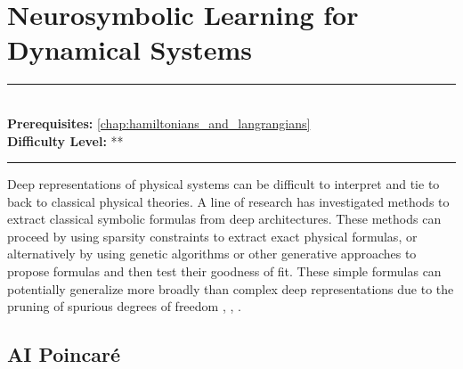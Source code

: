 \documentclass[book.tex]{subfiles}
\begin{document}
\chapter{Neurosymbolic Learning for Dynamical Systems}
\label{chap:symbolic_physics}
\noindent\rule{11cm}{0.4pt} \\
\textbf{Prerequisites:} \autoref{chap:hamiltonians_and_langrangians} \\
\textbf{Difficulty Level:} ** \\
\noindent\rule{11cm}{0.4pt}
\vspace{5mm}

Deep representations of physical systems can be difficult to interpret and tie to back to classical physical theories. A line of research has investigated methods to extract classical symbolic formulas from deep architectures. These methods can proceed by using sparsity constraints to extract exact physical formulas, or alternatively by using genetic algorithms or other generative approaches to propose formulas and then test their goodness of fit. These simple formulas can potentially generalize more broadly than complex deep representations due to the pruning of spurious degrees of freedom \cite{cranmer2019learning}, \cite{cranmer2020discovering}, \cite{cranmer2020lagrangian}.

\section{AI Poincar\'e}
\end{document}
